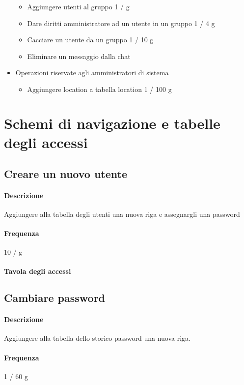 \documentclass[a4paper,12pt]{report}
\begin{document}
\begin{itemize}
{\begin{itemize}
        \item Aggiungere utenti al gruppo 1 / g
        \item Dare diritti amministratore ad un utente in un gruppo 1 / 4 g
        \item Cacciare un utente da un gruppo 1 / 10 g
        \item Eliminare un messaggio dalla chat
      \end{itemize}
    }
  \item {
      Operazioni riservate agli amministratori di sistema
      \begin{itemize}
        \item Aggiungere location a tabella location 1 / 100 g
      \end{itemize} 
    }
\end{itemize}
 
\section{Schemi di navigazione e tabelle degli accessi}

\subsection{Creare un nuovo utente}
\paragraph{Descrizione} Aggiungere alla tabella degli utenti una nuova riga e assegnargli una password 
\paragraph{Frequenza} 10 / g 
\paragraph{Tavola degli accessi}

\subsection{Cambiare password}
\paragraph{Descrizione} Aggiungere alla tabella dello storico password una nuova riga. 
\paragraph{Frequenza} 1 / 60 g 
\end{document}
